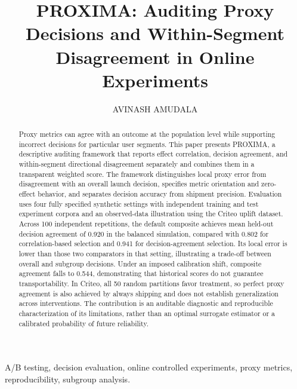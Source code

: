 \documentclass{ieeeaccess}
\begin{document}
\title{PROXIMA: Auditing Proxy Decisions and Within-Segment Disagreement in Online Experiments}
\author{\uppercase{Avinash Amudala}}
\address[1]{Independent Researcher (e-mail: aa9429@g.rit.edu)}
\begin{abstract}
Proxy metrics can agree with an outcome at the population level while supporting incorrect decisions for particular user segments. This paper presents PROXIMA, a descriptive auditing framework that reports effect correlation, decision agreement, and within-segment directional disagreement separately and combines them in a transparent weighted score. The framework distinguishes local proxy error from disagreement with an overall launch decision, specifies metric orientation and zero-effect behavior, and separates decision accuracy from shipment precision. Evaluation uses four fully specified synthetic settings with independent training and test experiment corpora and an observed-data illustration using the Criteo uplift dataset. Across 100 independent repetitions, the default composite achieves mean held-out decision agreement of 0.920 in the balanced simulation, compared with 0.802 for correlation-based selection and 0.941 for decision-agreement selection. Its local error is lower than those two comparators in that setting, illustrating a trade-off between overall and subgroup decisions. Under an imposed calibration shift, composite agreement falls to 0.544, demonstrating that historical scores do not guarantee transportability. In Criteo, all 50 random partitions favor treatment, so perfect proxy agreement is also achieved by always shipping and does not establish generalization across interventions. The contribution is an auditable diagnostic and reproducible characterization of its limitations, rather than an optimal surrogate estimator or a calibrated probability of future reliability.
\end{abstract}
\begin{keywords}
A/B testing, decision evaluation, online controlled experiments, proxy metrics, reproducibility, subgroup analysis.
\end{keywords}
\titlepgskip=-21pt
\maketitle
\end{document}

